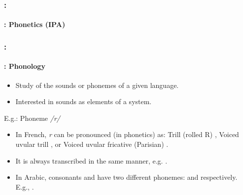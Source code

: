 \documentclass[xcolor=table]{beamer}
\begin{document}
\begin{frame}
	\frametitle{\insertshortsubtitle: \insertsection}
	\framesubtitle{\insertsubsection: Phonetics (IPA)}

	\begin{center}
	\end{center}

\end{frame}

\begin{frame}
	\frametitle{\insertshortsubtitle: \insertsection}
	\framesubtitle{\insertsubsection: Phonology}

	\begin{itemize}
		\item Study of the sounds or phonemes of a given language.
		\item Interested in sounds as elements of a system.
	\end{itemize}
	
	\begin{exampleblock}{E.g.: Phoneme \textit{/r/}}
		\begin{itemize}
			\item In French, \textit{r} can be pronounced (in phonetics) as: Trill (rolled R) \expword{\textipa{[r]}}, Voiced uvular trill \expword{\textipa{[\;R]}}, or Voiced uvular fricative (Parisian) \expword{\textipa{[K]}}.
			\item It is always transcribed in the same manner, e.g. .
			\item In Arabic, consonants  and  have two different phonemes:  and  respectively. 
			E.g., .
		\end{itemize}
	\end{exampleblock}

\end{frame}
\end{document}
